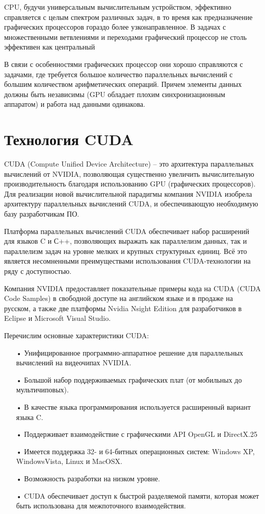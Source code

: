 \documentclass[a4paper,14pt,russian]{extreport}
\begin{document}
\par 
CPU, будучи универсальным вычислительным устройством, эффективно справляется с целым спектром различных задач, в то время как предназначение графических процессоров гораздо более узконаправленное. В задачах с множественными ветвлениями и переходами графический процессор не столь эффективен как центральный
\par
В связи с особенностями графических процессор они хорошо справляются с задачами, где требуется большое количество параллельных вычислений с большим количеством арифметических операций. Причем элементы данных должны быть независимы (GPU обладает плохим синхронизационным аппаратом) и работа над данными одинакова. 

\section{Технология CUDA}
\cite{cuda_best} \cite{sanders} \cite{kirk} \cite{boreskov}
\par
CUDA (Compute Unified Device Architecture) – это архитектура параллельных вычислений от NVIDIA, позволяющая существенно увеличить вычислительную производительность благодаря использованию GPU (графических процессоров). Для реализации новой вычислительной парадигмы компания NVIDIA изобрела архитектуру параллельных вычислений CUDA, и обеспечивающую необходимую базу разработчикам ПО.
\par
Платформа параллельных вычислений CUDA обеспечивает набор расширений для языков C и С++, позволяющих выражать как параллелизм данных, так и параллелизм задач на уровне мелких и крупных структурных единиц. Всё это является несомненными преимуществами использования CUDA-технологии на ряду с доступностью.
\par
Компания NVIDIA предоставляет показательные примеры кода на CUDA (CUDA Code Samples) в свободной доступе на английском языке и в продаже на русском, а также две платформы Nvidia Nsight Edition для разработчиков в Eclipse и Microsoft Visual Studio. 
\par Перечислим основные характеристики CUDA:
\begin{itemize}
\item[•] Унифицированное программно-аппаратное решение для параллельных вычислений на видеочипах NVIDIA.
\item[•] Большой набор поддерживаемых графических плат (от мобильных до мультичиповых).
\item[•] В качестве языка программирования используется расширенный вариант языка C.
\item[•] Поддерживает взаимодействие с графическими API OpenGL и DirectX.25
\item[•] Имеется поддержка 32- и 64-битных операционных систем: Windows XP, WindowsVista, Linux и MacOSX.
\item[•] Возможность разработки на низком уровне.
\item[•] CUDA обеспечивает доступ к быстрой разделяемой памяти, которая может быть использована для межпоточного взаимодействия.
\end{itemize}
\end{document}
